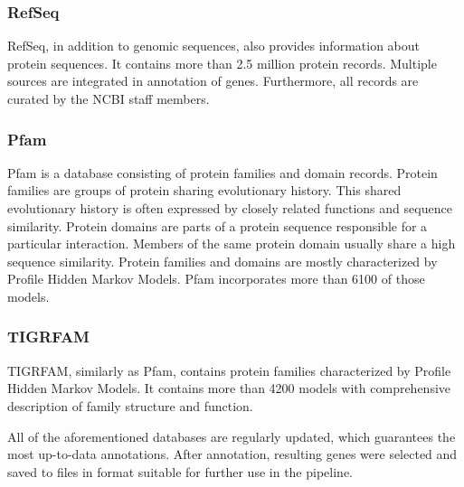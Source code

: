 \subsubsection{RefSeq}
RefSeq, in addition to genomic sequences, also provides information about protein sequences.
It contains more than 2.5 million protein records.
Multiple sources are integrated in annotation of genes.
Furthermore, all records are curated by the NCBI staff members.

\subsubsection{Pfam}
Pfam is a database consisting of protein families and domain records.
Protein families are groups of protein sharing evolutionary history.
This shared evolutionary history is often expressed by closely related functions and sequence similarity.
Protein domains are parts of a protein sequence responsible for a particular interaction. 
Members of the same protein domain usually share a high sequence similarity.
Protein families and domains are mostly characterized by Profile Hidden Markov Models.
Pfam incorporates more than 6100 of those models.

\subsubsection{TIGRFAM}
TIGRFAM, similarly as Pfam, contains protein families characterized by Profile Hidden Markov Models.
It contains more than 4200 models with comprehensive description of family structure and function.

\vspace{\baselineskip}

All of the aforementioned databases are regularly updated, which guarantees the most up-to-data annotations.
After annotation, resulting genes were selected and saved to files in format suitable for further use in the pipeline.

